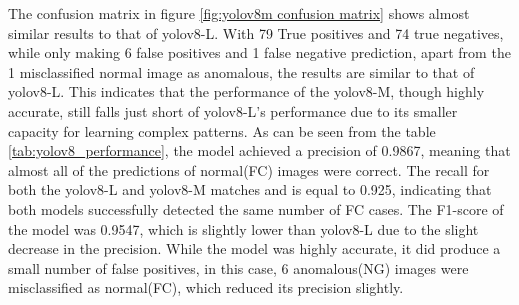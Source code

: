 The confusion matrix in figure \ref{fig:yolov8m confusion matrix} shows almost similar results to that of \gls{yolo}v8-L. With 79 True positives and 74 true negatives, while only making 6 false positives and 1 false negative prediction, apart from the 1 misclassified normal image as anomalous, the results are similar to that of \gls{yolo}v8-L. This indicates that the performance of the \gls{yolo}v8-M, though highly accurate, still falls just short of \gls{yolo}v8-L's performance due to its smaller capacity for learning complex patterns. As can be seen from the table \ref{tab:yolov8_performance}, the model achieved a precision of 0.9867, meaning that almost all of the predictions of normal(FC) images were correct. The recall for both the \gls{yolo}v8-L and \gls{yolo}v8-M matches and is equal to 0.925, indicating that both models successfully detected the same number of FC cases. The F1-score of the model was 0.9547, which is slightly lower than \gls{yolo}v8-L due to the slight decrease in the precision. While the model was highly accurate, it did produce a small number of false positives, in this case, 6 anomalous(NG) images were misclassified as normal(FC), which reduced its precision slightly.





